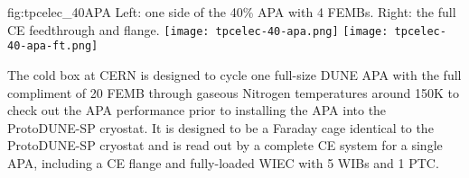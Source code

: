 \begin{dunefigure}
{fig:tpcelec_40APA}
{Left: one side of the 40\% APA with 4 FEMBs.  Right: the full CE feedthrough and flange.}
\texttt{[image: tpcelec-40-apa.png]}
\hspace{3mm}
\texttt{[image: tpcelec-40-apa-ft.png]}
\end{dunefigure}


The cold box at CERN is designed to cycle one full-size DUNE APA with the full compliment of 20 FEMB through gaseous Nitrogen temperatures around 150K to check out the APA performance prior to installing the APA into the ProtoDUNE-SP cryostat. It is designed to be a Faraday cage identical to the ProtoDUNE-SP cryostat and is read out by a complete CE system for a single APA, including a CE flange and fully-loaded WIEC with 5 WIBs and 1 PTC.
